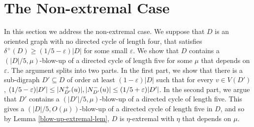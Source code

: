 \documentclass{article}
\renewcommand{\epsilon}{{\varepsilon}}
\DeclarePairedDelimiter{\abs}{\lvert}{\rvert}
\begin{document}
\section{The Non-extremal Case}\label{non-ext-section}
In this section we address the non-extremal case. We suppose that $D$ is an oriented graph  with no directed cycle of length four, that satisfies  $\delta^+(D)\geq (1/5-\epsilon)|D|$ for some small  $\epsilon$. We show that $D$ contains a $(|D|/5, \mu)$-blow-up of a directed cycle of length five for some $\mu$ that depends on $\epsilon$. The argument splits into two parts. In the first part, we show that there is a sub-digraph $D'\subseteq D$ of order at least $(1-\epsilon)|D|$ such that for every $v\in V(D')$, 
$(1/5-\epsilon)|D'|\leq \abs{N^+_{D'}(u)}, \abs{N^-_{D'}(u)}\leq (1/5+\epsilon)|D'|$. In the second part, we argue that $D'$ contains a $(|D'|/5, \mu)$-blow-up of a directed cycle of length five. This gives a $(|D|/5, O(\mu))$-blow-up of a directed cycle of length five in $D$, and so by Lemma \ref{blow-up-extremal-lem}, $D$ is $\eta$-extremal with $\eta$ that depends on $\mu$. 
\end{document}
